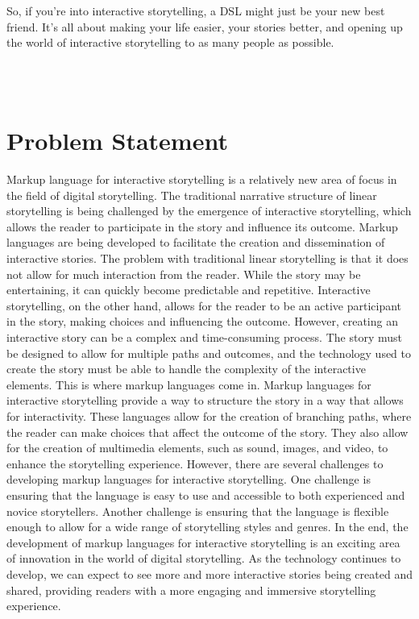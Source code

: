     So, if you're into interactive storytelling, a DSL might just be your new best friend. It's all about making your life easier, your stories better, and opening up the world of interactive storytelling to as many people as possible.
    
    
    
    
    \\
    \\

\section*{Problem Statement}   

Markup language for interactive storytelling is a relatively new area of focus in the field of digital storytelling. The traditional narrative structure of linear storytelling is being challenged by the emergence of interactive storytelling, which allows the reader to participate in the story and influence its outcome. Markup languages are being developed to facilitate the creation and dissemination of interactive stories.
The problem with traditional linear storytelling is that it does not allow for much interaction from the reader. While the story may be entertaining, it can quickly become predictable and repetitive. Interactive storytelling, on the other hand, allows for the reader to be an active participant in the story, making choices and influencing the outcome.
 However, creating an interactive story can be a complex and time-consuming process. The story must be designed to allow for multiple paths and outcomes, and the technology used to create the story must be able to handle the complexity of the interactive elements. This is where markup languages come in.
Markup languages for interactive storytelling provide a way to structure the story in a way that allows for interactivity. These languages allow for the creation of branching paths, where the reader can make choices that affect the outcome of the story. They also allow for the creation of multimedia elements, such as sound, images, and video, to enhance the storytelling experience.
However, there are several challenges to developing markup languages for interactive storytelling. One challenge is ensuring that the language is easy to use and accessible to both experienced and novice storytellers. Another challenge is ensuring that the language is flexible enough to allow for a wide range of storytelling styles and genres.
In the end, the development of markup languages for interactive storytelling is an exciting area of innovation in the world of digital storytelling. As the technology continues to develop, we can expect to see more and more interactive stories being created and shared, providing readers with a more engaging and immersive storytelling experience.

